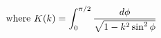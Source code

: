 \documentclass[preview]{standalone}
\begin{document}
\begin{align*}
\special{dvisvgm:raw <g id='unique000'>}\text{where } K(k) = \int_0^{\pi/2} \frac{d\phi}{\sqrt{1 - k^2\sin^2\phi}}\special{dvisvgm:raw </g>}
\end{align*}
\end{document}
